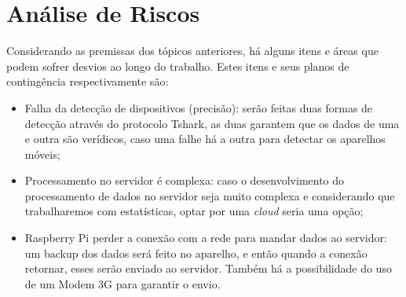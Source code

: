 \section{Análise de Riscos}
Considerando as premissas dos tópicos anteriores, há alguns itens e áreas que podem sofrer desvios ao longo do trabalho. Estes itens e seus planos
de contingência respectivamente são:

\begin{itemize}
  \item Falha da detecção de dispositivos (precisão): serão feitas duas formas de detecção através do protocolo Tshark, as duas garantem que os dados
  de uma e outra são verídicos, caso uma falhe há a outra para detectar os aparelhos móveis;
  \item Processamento no servidor é complexa: caso o desenvolvimento do processamento de dados no servidor seja muito complexa e considerando
  que trabalharemos com estatísticas, optar por uma \emph{cloud} seria uma opção;
  \item Raspberry Pi perder a conexão com a rede para mandar dados ao servidor: um backup dos dados será feito no aparelho, e então quando
  a conexão retornar, esses serão enviado ao servidor. Também há a possibilidade do uso de um Modem 3G para garantir o envio.
\end{itemize}
